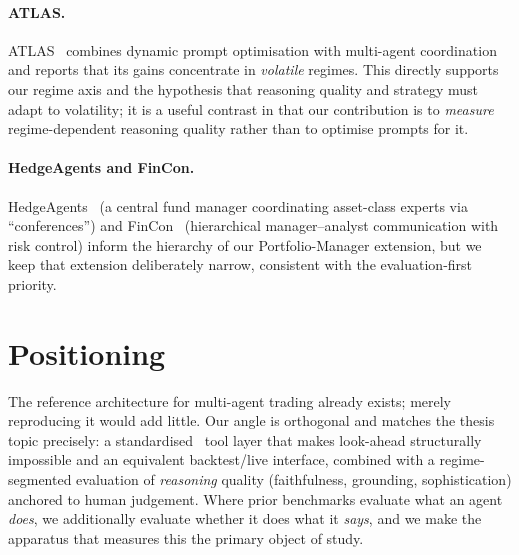 \paragraph{ATLAS.} ATLAS~\cite{atlas2025} combines dynamic prompt optimisation with
multi-agent coordination and reports that its gains concentrate in \emph{volatile} regimes.
This directly supports our regime axis and the hypothesis that reasoning quality and strategy
must adapt to volatility; it is a useful contrast in that our contribution is to \emph{measure}
regime-dependent reasoning quality rather than to optimise prompts for it.

\paragraph{HedgeAgents and FinCon.} HedgeAgents~\cite{hedgeagents2025} (a central fund manager
coordinating asset-class experts via ``conferences'') and FinCon~\cite{fincon2024}
(hierarchical manager--analyst communication with risk control) inform the hierarchy of our
Portfolio-Manager extension, but we keep that extension deliberately narrow, consistent with
the evaluation-first priority.

\section{Positioning}
\label{sec:rwpos}

The reference architecture for multi-agent trading already exists; merely reproducing it would
add little. Our angle is orthogonal and matches the thesis topic precisely: a standardised
\mcp\ tool layer that makes look-ahead structurally impossible and an equivalent backtest/live
interface, combined with a regime-segmented evaluation of \emph{reasoning} quality
(faithfulness, grounding, sophistication) anchored to human judgement. Where prior benchmarks
evaluate what an agent \emph{does}, we additionally evaluate whether it does what it
\emph{says}, and we make the apparatus that measures this the primary object of study.
